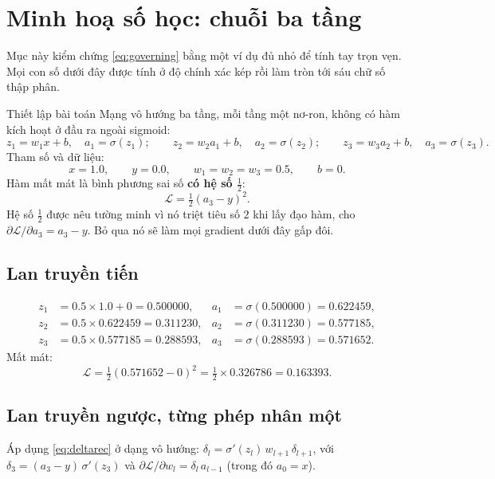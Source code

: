 \section{Minh hoạ số học: chuỗi ba tầng}
\label{sec:vidu}

Mục này kiểm chứng \eqref{eq:governing} bằng một ví dụ đủ nhỏ để tính tay trọn
vẹn. Mọi con số dưới đây được tính ở độ chính xác kép rồi làm tròn tới sáu chữ số
thập phân.

\begin{examplebox}{Thiết lập bài toán}
Mạng vô hướng ba tầng, mỗi tầng một nơ-ron, không có hàm kích hoạt ở đầu ra ngoài
sigmoid:
\[
  z_1 = w_1 x + b,\quad a_1 = \sigma(z_1);\qquad
  z_2 = w_2 a_1 + b,\quad a_2 = \sigma(z_2);\qquad
  z_3 = w_3 a_2 + b,\quad a_3 = \sigma(z_3).
\]
Tham số và dữ liệu:
\[
  x = 1.0,\qquad y = 0.0,\qquad w_1 = w_2 = w_3 = 0.5,\qquad b = 0 .
\]
Hàm mất mát là bình phương sai số \textbf{có hệ số $\tfrac{1}{2}$}:
\[
  \mathcal{L} = \tfrac{1}{2}\left(a_3 - y\right)^2 .
\]
Hệ số $\tfrac{1}{2}$ được nêu tường minh vì nó triệt tiêu số $2$ khi lấy đạo hàm,
cho $\partial\mathcal{L}/\partial a_3 = a_3 - y$. Bỏ qua nó sẽ làm mọi gradient
dưới đây gấp đôi.
\end{examplebox}

\subsection{Lan truyền tiến}

\begin{align*}
  z_1 &= 0.5\times 1.0 + 0 = 0.500000, &
  a_1 &= \sigma(0.500000) = 0.622459,\\[2pt]
  z_2 &= 0.5\times 0.622459 = 0.311230, &
  a_2 &= \sigma(0.311230) = 0.577185,\\[2pt]
  z_3 &= 0.5\times 0.577185 = 0.288593, &
  a_3 &= \sigma(0.288593) = 0.571652 .
\end{align*}
Mất mát:
\[
  \mathcal{L} = \tfrac{1}{2}\left(0.571652 - 0\right)^2
              = \tfrac{1}{2}\times 0.326786
              = 0.163393 .
\]

\subsection{Lan truyền ngược, từng phép nhân một}

Áp dụng \eqref{eq:deltarec} ở dạng vô hướng:
$\delta_l = \sigma'(z_l)\,w_{l+1}\,\delta_{l+1}$, với
$\delta_3 = (a_3-y)\,\sigma'(z_3)$ và
$\partial\mathcal{L}/\partial w_l = \delta_l\,a_{l-1}$ (trong đó $a_0 = x$).

